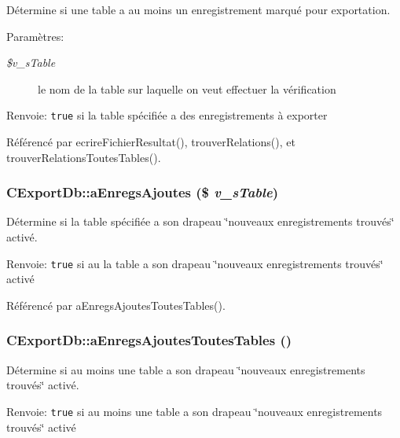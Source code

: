Détermine si une table a au moins un enregistrement marqué pour exportation. 

\begin{Desc}
\item[Paramètres:]
\begin{description}
\item[{\em \$v\_\-sTable}]le nom de la table sur laquelle on veut effectuer la vérification\end{description}
\end{Desc}
\begin{Desc}
\item[Renvoie:]{\tt true} si la table spécifiée a des enregistrements à exporter \end{Desc}


Référencé par ecrireFichierResultat(), trouverRelations(), et trouverRelationsToutesTables().
\subsubsection{\setlength{\rightskip}{0pt plus 5cm}CExportDb::aEnregsAjoutes (\$ {\em v\_\-sTable})}\label{class_c_export_db_ebfbd4afd4875ae8c5908c00a7dbde2b}


Détermine si la table spécifiée a son drapeau \char`\"{}nouveaux enregistrements trouvés\char`\"{} activé. 

\begin{Desc}
\item[Renvoie:]{\tt true} si au la table a son drapeau \char`\"{}nouveaux enregistrements trouvés\char`\"{} activé \end{Desc}


Référencé par aEnregsAjoutesToutesTables().
\subsubsection{\setlength{\rightskip}{0pt plus 5cm}CExportDb::aEnregsAjoutesToutesTables ()}\label{class_c_export_db_5612de77e77175294b7158447e22a81b}


Détermine si au moins une table a son drapeau \char`\"{}nouveaux enregistrements trouvés\char`\"{} activé. 

\begin{Desc}
\item[Renvoie:]{\tt true} si au moins une table a son drapeau \char`\"{}nouveaux enregistrements trouvés\char`\"{} activé \end{Desc}


